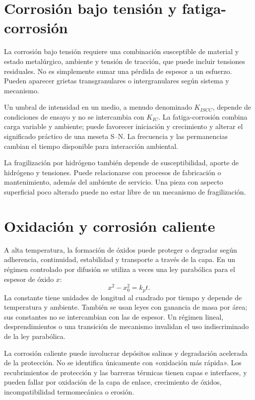 \section{Corrosión bajo tensión y fatiga-corrosión}
La corrosión bajo tensión requiere una combinación susceptible de material y estado metalúrgico, ambiente y tensión de tracción, que puede incluir tensiones residuales. No es simplemente sumar una pérdida de espesor a un esfuerzo. Pueden aparecer grietas transgranulares o intergranulares según sistema y mecanismo.

Un umbral de intensidad en un medio, a menudo denominado $K_{ISCC}$, depende de condiciones de ensayo y no se intercambia con $K_{IC}$. La fatiga-corrosión combina carga variable y ambiente; puede favorecer iniciación y crecimiento y alterar el significado práctico de una meseta S--N. La frecuencia y las permanencias cambian el tiempo disponible para interacción ambiental.

La fragilización por hidrógeno también depende de susceptibilidad, aporte de hidrógeno y tensiones. Puede relacionarse con procesos de fabricación o mantenimiento, además del ambiente de servicio. Una pieza con aspecto superficial poco alterado puede no estar libre de un mecanismo de fragilización.
\section{Oxidación y corrosión caliente}
A alta temperatura, la formación de óxidos puede proteger o degradar según adherencia, continuidad, estabilidad y transporte a través de la capa. En un régimen controlado por difusión se utiliza a veces una ley parabólica para el espesor de óxido $x$:
\begin{equation}x^2-x_0^2=k_p t.\label{eq:oxidacion}\end{equation}
La constante tiene unidades de longitud al cuadrado por tiempo y depende de temperatura y ambiente. También se usan leyes con ganancia de masa por área; sus constantes no se intercambian con las de espesor. Un régimen lineal, desprendimientos o una transición de mecanismo invalidan el uso indiscriminado de la ley parabólica.

La corrosión caliente puede involucrar depósitos salinos y degradación acelerada de la protección. No se identifica únicamente con «oxidación más rápida». Los recubrimientos de protección y las barreras térmicas tienen capas e interfaces, y pueden fallar por oxidación de la capa de enlace, crecimiento de óxidos, incompatibilidad termomecánica o erosión.
